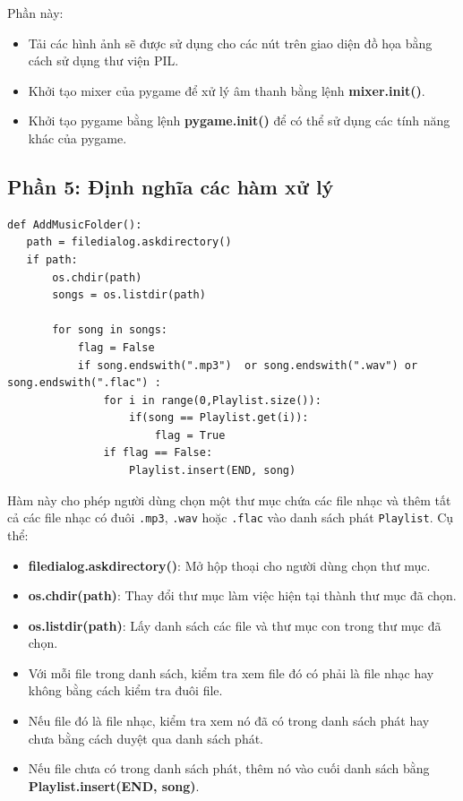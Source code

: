 \documentclass[a4paper]{article}
\begin{document}
\begin{enumerate}
Phần này:
\begin{itemize}
   \item Tải các hình ảnh sẽ được sử dụng cho các nút trên giao diện đồ họa bằng cách sử dụng thư viện PIL.
   \item Khởi tạo mixer của pygame để xử lý âm thanh bằng lệnh \textbf{mixer.init()}.
   \item Khởi tạo pygame bằng lệnh \textbf{pygame.init()} để có thể sử dụng các tính năng khác của pygame.
\end{itemize}

\subsection{Phần 5: Định nghĩa các hàm xử lý}
\begin{mdframed}[hidealllines=true,backgroundcolor=magenta!10]
\begin{lstlisting}
def AddMusicFolder():
   path = filedialog.askdirectory()
   if path:
       os.chdir(path)
       songs = os.listdir(path)

       for song in songs:
           flag = False
           if song.endswith(".mp3")  or song.endswith(".wav") or song.endswith(".flac") :
               for i in range(0,Playlist.size()):
                   if(song == Playlist.get(i)):
                       flag = True
               if flag == False:
                   Playlist.insert(END, song)
\end{lstlisting}
\end{mdframed}
Hàm này cho phép người dùng chọn một thư mục chứa các file nhạc và thêm tất cả các file nhạc có đuôi \texttt{.mp3}, \texttt{.wav} hoặc \texttt{.flac} vào danh sách phát \texttt{Playlist}. Cụ thể:
\begin{itemize}
   \item \textbf{filedialog.askdirectory()}: Mở hộp thoại cho người dùng chọn thư mục.
   \item \textbf{os.chdir(path)}: Thay đổi thư mục làm việc hiện tại thành thư mục đã chọn.
   \item \textbf{os.listdir(path)}: Lấy danh sách các file và thư mục con trong thư mục đã chọn.
   \item Với mỗi file trong danh sách, kiểm tra xem file đó có phải là file nhạc hay không bằng cách kiểm tra đuôi file.
   \item Nếu file đó là file nhạc, kiểm tra xem nó đã có trong danh sách phát hay chưa bằng cách duyệt qua danh sách phát.
   \item Nếu file chưa có trong danh sách phát, thêm nó vào cuối danh sách bằng \textbf{Playlist.insert(END, song)}.
\end{itemize}

\end{enumerate}
\end{document}
